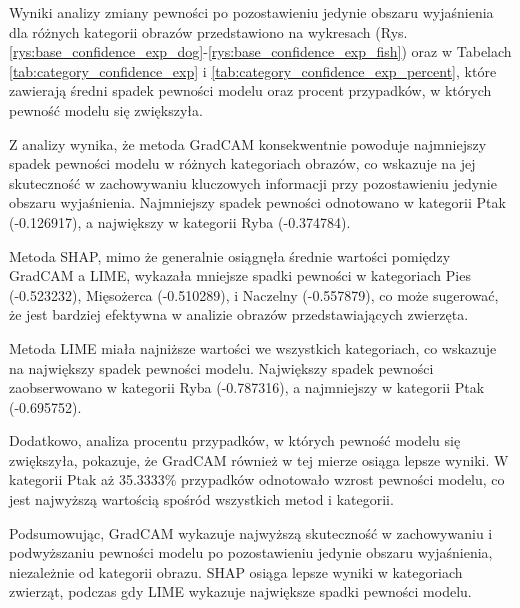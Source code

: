 Wyniki analizy zmiany pewności po pozostawieniu jedynie obszaru wyjaśnienia dla różnych kategorii obrazów przedstawiono na wykresach (Rys. \ref{rys:base_confidence_exp_dog}-\ref{rys:base_confidence_exp_fish}) oraz w Tabelach \ref{tab:category_confidence_exp} i \ref{tab:category_confidence_exp_percent}, które zawierają średni spadek pewności modelu oraz procent przypadków, w których pewność modelu się zwiększyła.

Z analizy wynika, że metoda GradCAM konsekwentnie powoduje najmniejszy spadek pewności modelu w różnych kategoriach obrazów, co wskazuje na jej skuteczność w zachowywaniu kluczowych informacji przy pozostawieniu jedynie obszaru wyjaśnienia.
Najmniejszy spadek pewności odnotowano w kategorii Ptak (-0.126917), a największy w kategorii Ryba (-0.374784).

Metoda SHAP, mimo że generalnie osiągnęła średnie wartości pomiędzy GradCAM a LIME, wykazała mniejsze spadki pewności w kategoriach Pies (-0.523232), Mięsożerca (-0.510289), i Naczelny (-0.557879), co może sugerować, że jest bardziej efektywna w analizie obrazów przedstawiających zwierzęta.

Metoda LIME miała najniższe wartości we wszystkich kategoriach, co wskazuje na największy spadek pewności modelu. Największy spadek pewności zaobserwowano w kategorii Ryba (-0.787316), a najmniejszy w kategorii Ptak (-0.695752).

Dodatkowo, analiza procentu przypadków, w których pewność modelu się zwiększyła, pokazuje, że GradCAM również w tej mierze osiąga lepsze wyniki. W kategorii Ptak aż 35.3333\% przypadków odnotowało wzrost pewności modelu, co jest najwyższą wartością spośród wszystkich metod i kategorii.

Podsumowując, GradCAM wykazuje najwyższą skuteczność w zachowywaniu i podwyższaniu pewności modelu po pozostawieniu jedynie obszaru wyjaśnienia, niezależnie od kategorii obrazu.
SHAP osiąga lepsze wyniki w kategoriach zwierząt, podczas gdy LIME wykazuje największe spadki pewności modelu.

